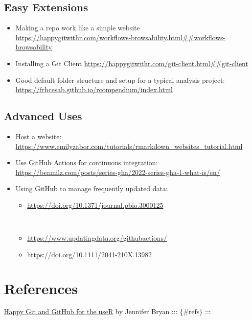 \documentclass[
  letterpaper,
  DIV=11,
  numbers=noendperiod]{scrreprt}
\providecommand{\tightlist}{%
  \setlength{\itemsep}{0pt}\setlength{\parskip}{0pt}}\usepackage{longtable,booktabs,array}
\begin{document}
\hypertarget{easy-extensions}{%
\section{Easy Extensions}\label{easy-extensions}}

\begin{itemize}
\tightlist
\item
  Making a repo work like a simple website
  \url{https://happygitwithr.com/workflows-browsability.html\#\#workflows-browsability}
\item
  Installing a Git Client
  \url{https://happygitwithr.com/git-client.html\#\#git-client}
\item
  Good default folder structure and setup for a typical analysis
  project: \url{https://frbcesab.github.io/rcompendium/index.html}
\end{itemize}

\hypertarget{advanced-uses}{%
\section{Advanced Uses}\label{advanced-uses}}

\begin{itemize}
\tightlist
\item
  Host a website:
  \url{https://www.emilyzabor.com/tutorials/rmarkdown_websites_tutorial.html}
\item
  Use GitHub Actions for continuous integration:
  \url{https://beamilz.com/posts/series-gha/2022-series-gha-1-what-is/en/}
\item
  Using GitHub to manage frequently updated data:

  \begin{itemize}
  \tightlist
  \item
    \url{https://doi.org/10.1371/journal.pbio.3000125}\strut \\
  \item
    \url{https://www.updatingdata.org/githubactions/}
  \item
    \url{https://doi.org/10.1111/2041-210X.13982}
  \end{itemize}
\end{itemize}


\hypertarget{references}{%
\chapter*{References}\label{references}}


\href{https://happygitwithr.com/index.html}{Happy Git and GitHub for the
useR} by Jennifer Bryan ::: \{\#refs\} :::
\end{document}
